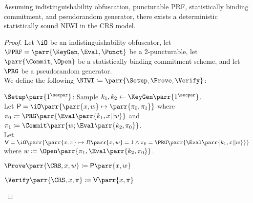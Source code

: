 \begin{theorem}
    Assuming indistinguishability obfuscation,
    puncturable PRF,
    statistically binding commitment,
    and pseudorandom generator,
    there exists a deterministic statistically sound NIWI in the CRS model.
\end{theorem}

\begin{proof}
    Let \(\iO\) be an indistinguishability obfuscator,
    let \(\PPRF = \parr{\KeyGen, \Eval, \Punct}\) be a 2-puncturable,
    let \(\parr{\Commit,\Open}\) be a statistically binding commitment scheme,
    and let \(\PRG\) be a pseudorandom generator.
    \\
    We define the following \(\NIWI \coloneqq \parr{\Setup, \Prove, \Verify}\):
    \begin{sitemize}
        \item \(\Setup\parr{1^\secpar}\):
        Sample \(k_1,k_2 \gets \KeyGen\parr{1^\secpar}\).
        \\
        Let \(\mathsf{P} = \iO\parr{\parr{x, w} \mapsto \parr{\pi_0,\pi_1}}\) where \(\pi_0 \coloneqq \PRG\parr{\Eval\parr{k_1,x||w}}\) and \(\pi_1 \coloneqq \Commit\parr{w; \Eval\parr{k_2,\pi_0}}\).
        \\
        Let \(\mathsf{V} = \iO\parr{\parr{x, \pi} \mapsto R\parr{x,w} = 1 \wedge \pi_0 = \PRG\parr{\Eval\parr{k_1,x||w}}}\) where \(w \coloneqq \Open\parr{\pi_1, \Eval\parr{k_2,\pi_0}}\).

        \item \(\Prove\parr{\CRS,x,w} \coloneqq \mathsf{P}\parr{x,w}\)

        \item \(\Verify\parr{\CRS,x,\pi} \coloneqq \mathsf{V}\parr{x,\pi}\)
    \end{sitemize}


\end{proof}
